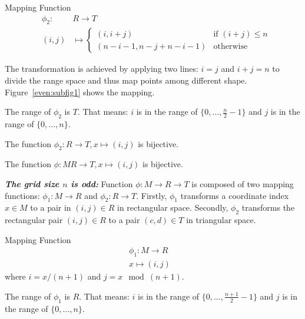 \documentclass[AMA,LATO1COL]{WileyNJD-v2-bak}
\begin{document}
\begin{definition}
Mapping Function
\begin{eqnarray}
&\phi_2:&   R \rightarrow  T  \\
&(i,j)& \mapsto
  \begin{cases}
   (i,i+j) & \text{if } (i+j) \leq n \\
   (n-i-1,n-j+n-i-1) & \text{otherwise}
  \end{cases}
\end{eqnarray}
\end{definition}
The transformation is achieved by applying two lines: $i=j$ and $i+j=n$ to divide the range space and thus map points among different shape. Figure~\ref{even:subfig1} shows the mapping.

\vspace{5mm}
\begin{lemma}
The range of $\phi_2$ is $T$. That means: $i$ is in the range of  $\{0,...,\frac{n}{2}-1\}$ and $j$ is in the range of $\{0,...,n\}$.
\end{lemma}
\vspace{5mm}
\begin{lemma}
The function $\phi_2:   R \rightarrow  T,x \mapsto (i,j)$ is bijective.
\end{lemma}
\vspace{5mm}
\begin{corollary}
The function $\phi:   M   R \rightarrow  T,x \mapsto (i,j)$ is bijective.
\end{corollary}
\vspace{5mm}
\noindent \textbf{\textit{The grid size $n$ is odd:}} Function $\phi:  M \rightarrow  R \rightarrow  T$ is composed of two mapping functions: $\phi_1:  M \rightarrow  R$ and $\phi_2:  R \rightarrow  T$. Firstly, $\phi_1$ transforms a coordinate index $x\in  M$ to a pair in $(i,j)\in  R$ in rectangular space. Secondly, $\phi_2$ transforms the rectangular pair $(i,j)\in  R$ to a pair $(c,d)\in  T$ in triangular space.
\vspace{5mm}
\noindent\begin{definition}
Mapping Function
\begin{eqnarray}
\phi_1:   M \rightarrow  R & \\
x \mapsto (i,j)
\end{eqnarray}
 where  $i  = x / (n+1)$ and $j = x \mod (n+1)$.
\end{definition}
 \vspace{5mm}
\begin{lemma}
The range of $\phi_1$ is $R$. That means: $i$ is in the range of  $\{0,...,\frac{n+1}{2}-1\}$ and $j$ is in the range of $\{0,...,n\}$.
\end{lemma}
\end{document}

